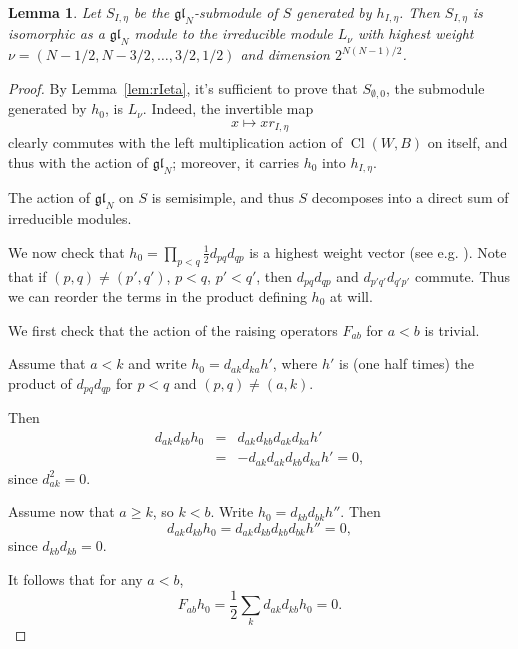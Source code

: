 \documentclass[11pt]{article}
\newtheorem{lemma}{Lemma}
\newcommand{\Cl}{\operatorname{Cl}}
\newcommand{\myd}{d}
\begin{document}
\begin{lemma}
    Let $S_{I,\eta}$ be the $\mathfrak{gl}_N$-submodule of $S$ generated by $h_{I,\eta}$. Then $S_{I,\eta}$ is isomorphic as a $\mathfrak{gl}_N$ module to the irreducible module $L_\nu$ with highest weight $\nu = (N-1/2, N-3/2,\dots,3/2,1/2)$ and dimension $2^{N(N-1)/2}$.
\end{lemma}
\begin{proof}
By Lemma~\ref{lem:rIeta}, it's sufficient to prove that $S_{\emptyset,0}$, the submodule generated by $h_0$, is $L_\nu$.  Indeed, the invertible map $$x\mapsto x r_{I,\eta}$$ clearly commutes with the left multiplication action of $\Cl(W,B)$ on itself, and thus with the action of $\mathfrak{gl}_N$; moreover, it carries $h_0$ into $h_{I,\eta}$. 

The action of $\mathfrak{gl}_N$ on $S$ is semisimple, and thus $S$ decomposes into a direct sum of irreducible modules.

We now check that $h_0 =\prod_{p<q} \frac{1}{2}\myd_{pq}\myd_{qp} $ is a highest weight vector (see e.g. \cite[\S3.2.1]{GoodmanWallach}).  Note that if $(p,q)\neq (p',q')$, $p<q$, $p'<q'$, then $\myd_{pq}\myd_{qp}$ and $\myd_{p'q'}\myd_{q'p'}$ commute. Thus we can reorder the terms in the product defining $h_0$ at will.

We first check that the action of the raising operators $F_{ab}$ for $a<b$ is trivial.

Assume that $a<k$ and write $h_0 = \myd_{ak}\myd_{ka} h'$, where $h'$ is (one half times) the product of $\myd_{pq}\myd_{qp}$ for $p<q$ and $(p,q)\neq (a,k)$. 

Then \begin{eqnarray*}
    \myd_{ak}\myd_{kb} h_0 &=&  \myd_{ak}\myd_{kb} \myd_{ak}\myd_{ka} h' \\
    &=&  - \myd_{ak} \myd_{ak} \myd_{kb} \myd_{ka} h' = 0,
\end{eqnarray*}
since $\myd_{ak}^2=0$.

Assume now that $a\geq k$, so $k<b$.  Write $h_0 = \myd_{kb}\myd_{bk} h''$.  Then $$
    \myd_{ak}\myd_{kb} h_0  =  \myd_{ak}\myd_{kb} \myd_{kb}\myd_{bk} h'' = 0,
$$
since   $\myd_{kb} \myd_{kb}=0$.

It follows that for any $a<b$,  $$F_{ab} h_0 = \frac{1}{2}\sum_k \myd_{ak}\myd_{kb} h_0 =0.$$


\end{proof}
\end{document}

